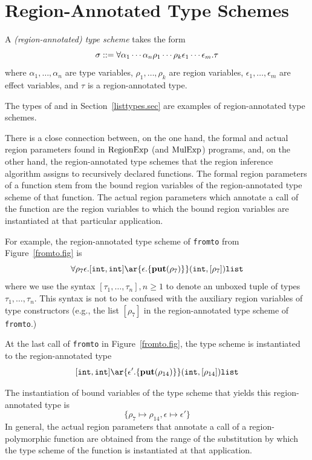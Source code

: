 \documentclass[12pt]{book}
\begin{document}
\section{Region-Annotated Type Schemes}
\label{regtych.sec}
A 
%
%
{\em (region-annotated) type scheme\/} takes the form
$$\sigma::=\forall\alpha_1\cdots\alpha_n\rho_1\cdots\rho_k\epsilon_1\cdots\epsilon_m.\tau$$
where $\alpha_1,\ldots,\alpha_n$ are type variables,
$\rho_1,\ldots,\rho_k$ are region variables,
$\epsilon_1,\ldots,\epsilon_m$ are 
%
effect variables, and $\tau$ is a region-annotated type.

The types of  and \boxml{::} in Section~\ref{listtypes.sec} are examples of 
%
region-annotated type schemes. 

There is a close connection between, on the one hand, the formal and
actual 
%
region parameters found in $\hbox{\rm RegionExp}$ (and $\hbox{\rm MulExp}$) programs, and, on
the other hand, the region-annotated type schemes that the region inference
algorithm assigns to recursively declared functions. The formal region
parameters of a function stem from the bound region variables of the
region-annotated type scheme of that function.  The actual region parameters
which annotate a call of the function are the region variables to
which the bound region variables are instantiated at that particular
application.

For example, the region-annotated type scheme of {\tt fromto} from
Figure~\ref{fromto.fig} is
$$\forall\rho_7\epsilon. [\boxml{int}, \boxml{int} ]
\ar{\epsilon.\{\Put(\rho_7)\}} (\boxml{int},[\rho_7])\boxml{list}$$
where we use the syntax $[\tau_1, \ldots, \tau_n], n \geq 1$ to denote
an unboxed tuple of types $\tau_1, \ldots,\tau_n$. This syntax is not
to be confused with the auxiliary region variables of type
constructors (e.g., the list $[\rho_7]$ in the region-annotated type
scheme of {\tt fromto}.)

At the last call of {\tt fromto} in Figure~\ref{fromto.fig},
the type scheme is instantiated to the region-annotated type
$$[\boxml{int}, \boxml{int}] \ar{\epsilon'.\{\Put(\rho_{14})\}}
(\boxml{int},[\rho_{14}])\boxml{list}$$

The instantiation of bound variables of the type scheme that yields
this region-annotated type is
$$\{\rho_7\mapsto\rho_{14}, \epsilon\mapsto\epsilon'\}$$
In general,
the actual region parameters that annotate a call of a
region-polymorphic function are obtained from the range of the
substitution by which the type scheme of the function is instantiated
at that application.
\end{document}
